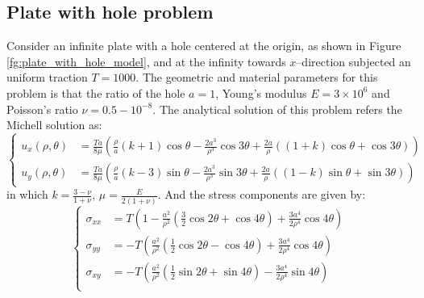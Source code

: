\subsection{Plate with hole problem}
Consider an infinite plate with a hole centered at the origin, as shown in Figure \ref{fg:plate_with_hole_model},
and at the infinity towards $x$--direction subjected an uniform traction $T=1000$.
The geometric and material parameters for this problem is that the ratio of the hole $a=1$, Young's modulus $E=3\times 10^6$ and Poisson's ratio $\nu = 0.5-10^{-8}$.
The analytical solution of this problem refers the Michell solution \cite{timoshenko1969theory} as:
\begin{equation}\label{plate_with_hole_exact}
    \left \{
    \begin{aligned}
        u_x(\rho,\theta)&=\frac{Ta}{8\mu}\left (\frac{\rho}{a}(k+1)\cos\theta-\frac{2a^3}{\rho^3}\cos3\theta    +\frac{2a}{\rho}((1+k)\cos\theta+\cos3\theta) \right )\\
        u_y(\rho,\theta)&=\frac{Ta}{8\mu}\left (\frac{\rho}{a}(k-3)\sin\theta-\frac{2a^3}{\rho^3}\sin3\theta    +\frac{2a}{\rho}((1-k)\sin\theta+\sin3\theta) \right )  
    \end{aligned}
    \right .
\end{equation}
in which $k = \frac{3-\nu}{1+\nu}$, $\mu = \frac{E}{2(1+\nu)}$.
And the stress components are given by:
\begin{equation}
    \left \{
    \begin{aligned}
        \sigma_{xx}&=T\left (1-\frac{a^2}{\rho^2}(\frac{3}{2}\cos2\theta+\cos4\theta)+\frac{3a^4}{2\rho^4}\cos4\theta\right )\\
        \sigma_{yy}&=-T\left (\frac{a^2}{\rho^2}(\frac{1}{2}\cos2\theta-\cos4\theta)+\frac{3a^4}{2\rho^4}\cos4\theta\right )\\
        \sigma_{xy}&=-T\left (\frac{a^2}{\rho^2}(\frac{1}{2}\sin2\theta+\sin4\theta)-\frac{3a^4}{2\rho^4}\sin4\theta\right )\\
    \end{aligned}
    \right .
\end{equation}

